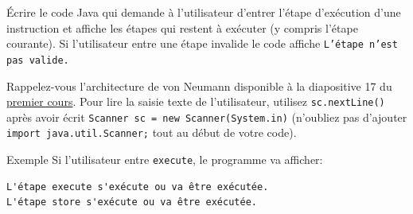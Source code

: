 
\begin{Exercice}[5 minutes] 
    Écrire le code Java qui demande à l'utilisateur d'entrer l'étape d'exécution d'une instruction et affiche les étapes qui restent à exécuter (y compris l'étape courante). 
    Si l'utilisateur entre une étape invalide le code affiche \texttt{L'étape n'est pas valide.}

    \begin{conseil}
    Rappelez-vous l'architecture de von Neumann 
    disponible à la diapositive 
    17 du \href{https://moodle.unil.ch/mod/resource/view.php?id=2218900}{premier cours}. Pour lire 
    la saisie texte de l'utilisateur, utilisez \texttt{sc.nextLine()} après avoir écrit \texttt{Scanner sc = new Scanner(System.in)} (n'oubliez pas d'ajouter \texttt{import java.util.Scanner;} tout au début de votre code).
    \end{conseil}


   \begin{Example}{Exemple}
Si l'utilisateur entre \texttt{execute}, le programme va afficher:
\begin{lstlisting}[numbers=none, keywordstyle=\color{black}, stringstyle=\color{black}]
L'étape execute s'exécute ou va être exécutée. 
L'étape store s'exécute ou va être exécutée.
\end{lstlisting}
   \end{Example}

    \begin{solution}
         
    \end{solution}
    
\end{Exercice}

